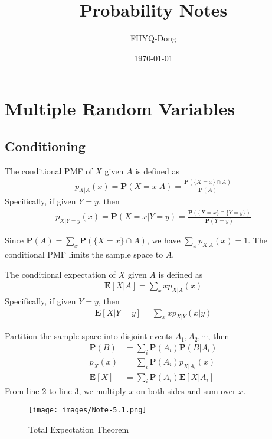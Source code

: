 \documentclass[device=normal, lang=en, fontsize=12pt]{elegantnote}
\title{Probability Notes}
\author{FHYQ-Dong}
\date{\today}
\numberwithin{equation}{section}
\theoremstyle{definition} %
\begin{document}
\maketitle
\newpage
\tableofcontents
\newpage








\section{Multiple Random Variables}
\subsection{Conditioning}
\begin{definition}
    The conditional PMF of $X$ given $A$ is defined as
    \begin{align}
        p_{X|A}(x) = \mathbf{P}(X = x | A) = \frac{\mathbf{P}(\{X = x\} \cap A)}{\mathbf{P}(A)}
    \end{align}
    Specifically, if given $Y = y$, then
    \begin{align}
        p_{X|Y = y}(x) = \mathbf{P}(X = x | Y = y) = \frac{\mathbf{P}(\{X = x\} \cap \{Y = y\})}{\mathbf{P}(Y = y)}
    \end{align}
\end{definition}
Since $\mathbf{P}(A) = \sum_{x} \mathbf{P}(\{X = x\} \cap A)$, we have $\sum_{x} p_{X|A}(x) = 1$.
The conditional PMF limits the sample space to $A$.
\begin{definition}
    The conditional expectation of $X$ given $A$ is defined as
    \begin{align}
        \mathbf{E}[X|A] = \sum_{x} x p_{X|A}(x)
    \end{align}
    Specifically, if given $Y = y$, then
    \begin{align}
        \mathbf{E}[X|Y = y] = \sum_{x} x p_{X|Y}(x|y)
    \end{align}
\end{definition}
\begin{theorem}
    Partition the sample space into disjoint events $A_{1}, A_{2}, \cdots$, then
    \begin{equation}
    \begin{aligned}
        \mathbf{P}(B) &= \sum_{i} \mathbf{P}(A_{i}) \mathbf{P}(B|A_{i}) \\ 
        p_{X}(x) &= \sum_{i} \mathbf{P}(A_{i}) p_{X|A_{i}}(x) \\
        \mathbf{E}[X] &= \sum_{i} \mathbf{P}(A_{i}) \mathbf{E}[X|A_{i}]
    \end{aligned}
    \end{equation}
    From line 2 to line 3, we multiply $x$ on both sides and sum over $x$.
    \begin{figure}[H]
        \centering
        \texttt{[image: images/Note-5.1.png]}
        \caption{Total Expectation Theorem}
    \end{figure}
\end{theorem}
\end{document}
